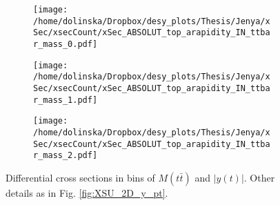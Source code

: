 \begin{figure}[p]
\centering
\begin{subfigure}
  \centering
  \texttt{[image: /home/dolinska/Dropbox/desy\_plots/Thesis/Jenya/xSec/xsecCount/xSec\_ABSOLUT\_top\_arapidity\_IN\_ttbar\_mass\_0.pdf]}
\end{subfigure}
\begin{subfigure}
  \centering
  \texttt{[image: /home/dolinska/Dropbox/desy\_plots/Thesis/Jenya/xSec/xsecCount/xSec\_ABSOLUT\_top\_arapidity\_IN\_ttbar\_mass\_1.pdf]}
\end{subfigure}
\begin{subfigure}
  \centering
  \texttt{[image: /home/dolinska/Dropbox/desy\_plots/Thesis/Jenya/xSec/xsecCount/xSec\_ABSOLUT\_top\_arapidity\_IN\_ttbar\_mass\_2.pdf]}
\end{subfigure}
\caption{Differential cross sections in bins of $M(t\bar{t})$ and $|y(t)|$. Other details as in Fig. \ref{fig:XSU_2D_y_pt}.}
\label{fig:XSU_2D_Mtt_yt}
\end{figure}

